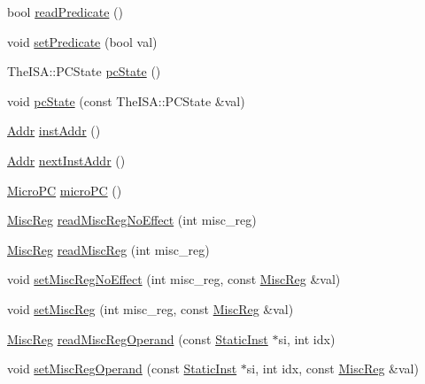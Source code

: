 \begin{DoxyCompactItemize}
\item 
bool \hyperlink{classCheckerCPU_a254cecc48d457ea298b08a8bb009f9cf}{readPredicate} ()
\item 
void \hyperlink{classCheckerCPU_a137a8c6cced89c2ff8387900439436b4}{setPredicate} (bool val)
\item 
TheISA::PCState \hyperlink{classCheckerCPU_a827fb3454585cf4c620f4fd341966317}{pcState} ()
\item 
void \hyperlink{classCheckerCPU_a5e9cfc754c9ef9b7db875ce89871944e}{pcState} (const TheISA::PCState \&val)
\item 
\hyperlink{base_2types_8hh_af1bb03d6a4ee096394a6749f0a169232}{Addr} \hyperlink{classCheckerCPU_a53c92716db281ae16ffb693c6d7803c7}{instAddr} ()
\item 
\hyperlink{base_2types_8hh_af1bb03d6a4ee096394a6749f0a169232}{Addr} \hyperlink{classCheckerCPU_aceec6e28772f91b3cc921c0e3927b0c2}{nextInstAddr} ()
\item 
\hyperlink{base_2types_8hh_adfb4d8b20c5abc8be73dd367b16f2d57}{MicroPC} \hyperlink{classCheckerCPU_a1a21696f33a7d38f251687ae0b5e9718}{microPC} ()
\item 
\hyperlink{classCheckerCPU_aaf5f073a387db0556d1db4bcc45428bc}{MiscReg} \hyperlink{classCheckerCPU_a7b5ac6af9c2c19d7c1b442b8a3aebbc6}{readMiscRegNoEffect} (int misc\_\-reg)
\item 
\hyperlink{classCheckerCPU_aaf5f073a387db0556d1db4bcc45428bc}{MiscReg} \hyperlink{classCheckerCPU_a5a8c6c487e8da143d26188258b04f1cc}{readMiscReg} (int misc\_\-reg)
\item 
void \hyperlink{classCheckerCPU_a763517aaea2f3decbc1ef9d064216b6f}{setMiscRegNoEffect} (int misc\_\-reg, const \hyperlink{classCheckerCPU_aaf5f073a387db0556d1db4bcc45428bc}{MiscReg} \&val)
\item 
void \hyperlink{classCheckerCPU_a1877dde4f3eb17a8b7d33ea40176c148}{setMiscReg} (int misc\_\-reg, const \hyperlink{classCheckerCPU_aaf5f073a387db0556d1db4bcc45428bc}{MiscReg} \&val)
\item 
\hyperlink{classCheckerCPU_aaf5f073a387db0556d1db4bcc45428bc}{MiscReg} \hyperlink{classCheckerCPU_ac6d0dc1a63cede82f4242d43236a98db}{readMiscRegOperand} (const \hyperlink{classStaticInst}{StaticInst} $\ast$si, int idx)
\item 
void \hyperlink{classCheckerCPU_a6cfad8f780bab7feb893941cb0d46160}{setMiscRegOperand} (const \hyperlink{classStaticInst}{StaticInst} $\ast$si, int idx, const \hyperlink{classCheckerCPU_aaf5f073a387db0556d1db4bcc45428bc}{MiscReg} \&val)
\item 

\end{DoxyCompactItemize}
